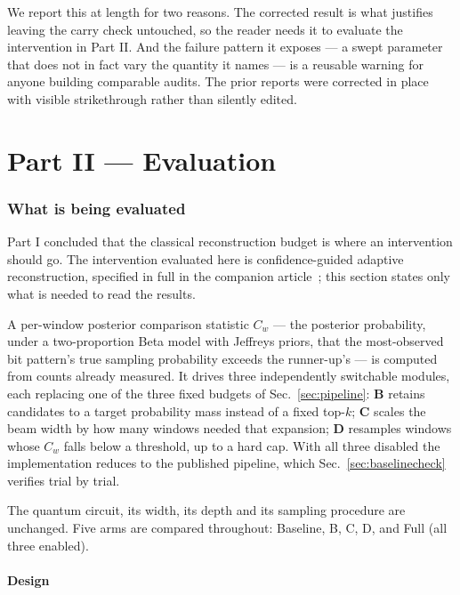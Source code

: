 \documentclass[preprint,11pt]{elsarticle}
\newcommand{\Cw}{C_w}
\begin{document}
We report this at length for two reasons. The corrected result is what
justifies leaving the carry check untouched, so the reader needs it to
evaluate the intervention in Part II. And the failure pattern it exposes ---
a swept parameter that does not in fact vary the quantity it names --- is a
reusable warning for anyone building comparable audits. The prior reports
were corrected in place with visible strikethrough rather than silently
edited.

\part*{Part II --- Evaluation}

\section{What is being evaluated}
\label{sec:method}

Part I concluded that the classical reconstruction budget is where an
intervention should go. The intervention evaluated here is
confidence-guided adaptive reconstruction, specified in full in the
companion article~\cite{methodpaper}; this section states only what is
needed to read the results.

A per-window posterior comparison statistic $\Cw$ --- the posterior
probability, under a two-proportion Beta model with Jeffreys priors, that
the most-observed bit pattern's true sampling probability exceeds the
runner-up's --- is computed from counts already measured. It drives three
independently switchable modules, each replacing one of the three fixed
budgets of Sec.~\ref{sec:pipeline}: \textbf{B} retains candidates to a
target probability mass instead of a fixed top-$k$; \textbf{C} scales the
beam width by how many windows needed that expansion; \textbf{D} resamples
windows whose $\Cw$ falls below a threshold, up to a hard cap. With all
three disabled the implementation reduces to the published pipeline, which
Sec.~\ref{sec:baselinecheck} verifies trial by trial.

The quantum circuit, its width, its depth and its sampling procedure are
unchanged. Five arms are compared throughout: Baseline, B, C, D, and Full
(all three enabled).

\subsection{Design}
\label{sec:design}
\end{document}
